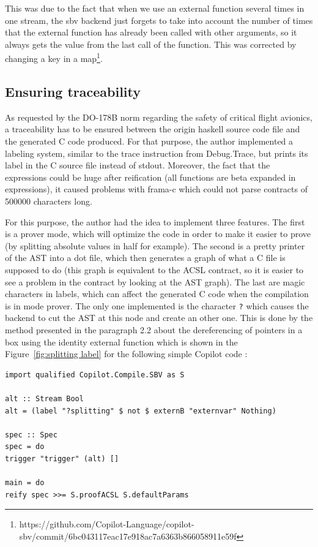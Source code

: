 \documentclass[a4paper,11pt,final]{article}
\begin{document}
	This was due to the fact that when we use an external function several times in one stream, the sbv backend just forgets to take into account the number of times that the external function has already been called with other arguments, so it always gets the value from the last call of the function. This was corrected by changing a key in a map\footnote{https://github.com/Copilot-Language/copilot-sbv/commit/6bc043117eac17e918ac7a6363b866058911e59f}. 
	
	\subsection{Ensuring traceability}
	
	As requested by the DO-178B norm regarding the safety of critical flight avionics, a traceability has to be ensured between the origin haskell source code file and the generated C code produced. For that purpose, the author implemented a labeling system, similar to the trace instruction from Debug.Trace, but prints its label in the C source file instead of stdout. Moreover, the fact that the expressions could be huge after reification (all functions are beta expanded in expressions), it caused problems with frama-c which could not parse contracts of 500000 characters long. 
	
	For this purpose, the author had the idea to implement three features. The first is a prover mode, which will optimize the code in order to make it easier to prove (by splitting absolute values in half for example). The second is a pretty printer of the AST into a dot file, which then generates a graph of what a C file is supposed to do (this graph is equivalent to the ACSL contract, so it is easier to see a problem in the contract by looking at the AST graph). The last are magic characters in labels, which can affect the generated C code when the compilation is in mode prover. The only one implemented is the character \texttt{?} which causes the backend to cut the AST at this node and create an other one. This is done by the method presented in the paragraph 2.2 about the dereferencing of pointers in a box using the identity external function which is shown in the Figure~\ref{fig:splitting label} for the following simple Copilot code :
\begin{verbatim}
import qualified Copilot.Compile.SBV as S

alt :: Stream Bool
alt = (label "?splitting" $ not $ externB "externvar" Nothing)

spec :: Spec
spec = do
trigger "trigger" (alt) []
	
main = do
reify spec >>= S.proofACSL S.defaultParams
\end{verbatim}
\end{document}
